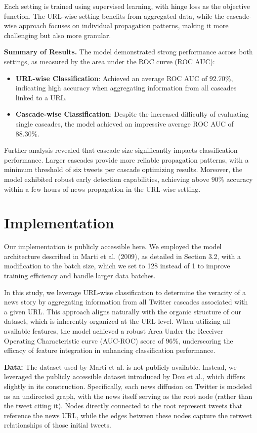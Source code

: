 \documentclass[sigconf,nonacm]{acmart}
\begin{document}
Each setting is trained using supervised learning, with hinge loss as the objective function. The URL-wise setting benefits from aggregated data, while the cascade-wise approach focuses on individual propagation patterns, making it more challenging but also more granular.

\textbf{Summary of Results.}
The model demonstrated strong performance across both settings, as measured by the area under the ROC curve (ROC AUC):
\begin{itemize}
    \item \textbf{URL-wise Classification}: Achieved an average ROC AUC of $92.70\%$, indicating high accuracy when aggregating information from all cascades linked to a URL.
    \item \textbf{Cascade-wise Classification}: Despite the increased difficulty of evaluating single cascades, the model achieved an impressive average ROC AUC of $88.30\%$.
\end{itemize}

Further analysis revealed that cascade size significantly impacts classification performance. Larger cascades provide more reliable propagation patterns, with a minimum threshold of six tweets per cascade optimizing results. Moreover, the model exhibited robust early detection capabilities, achieving above $90\%$ accuracy within a few hours of news propagation in the URL-wise setting.

\section{Implementation}

Our implementation is publicly accessible here. We employed the model architecture described in Marti et al. (2009), as detailed in Section 3.2, with a modification to the batch size, which we set to 128 instead of 1 to improve training efficiency and handle larger data batches.

In this study, we leverage URL-wise classification to determine the veracity of a news story by aggregating information from all Twitter cascades associated with a given URL. This approach aligns naturally with the organic structure of our dataset, which is inherently organized at the URL level. When utilizing all available features, the model achieved a robust Area Under the Receiver Operating Characteristic curve (AUC-ROC) score of 96\%, underscoring the efficacy of feature integration in enhancing classification performance.

\textbf{Data:} The dataset used by Marti et al. is not publicly available. Instead, we leveraged the publicly accessible dataset introduced by Dou et al., which differs slightly in its construction. Specifically, each news diffusion on Twitter is modeled as an undirected graph, with the news itself serving as the root node (rather than the tweet citing it). Nodes directly connected to the root represent tweets that reference the news URL, while the edges between these nodes capture the retweet relationships of those initial tweets.
\end{document}
